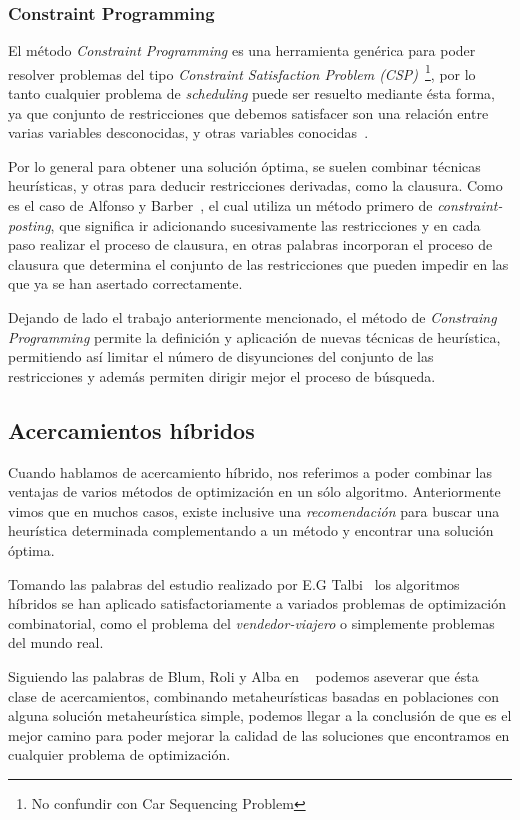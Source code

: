\subsubsection{Constraint Programming}

El método \emph{Constraint Programming} es una herramienta genérica para poder resolver problemas
del tipo \emph{Constraint  Satisfaction Problem (CSP)}~\footnote{No confundir con Car Sequencing Problem},
por lo tanto cualquier problema de \emph{scheduling} puede ser resuelto mediante ésta forma,
ya que conjunto de restricciones que debemos satisfacer son una relación entre varias variables desconocidas,
y otras variables conocidas~\cite{Tsa93}.

%
Por lo general para obtener una solución óptima, se suelen combinar técnicas heurísticas,
y otras para deducir restricciones derivadas, como la clausura.
Como es el caso de Alfonso y Barber~\cite{esp1}, el cual utiliza un método primero de \emph{constraint-posting},
que significa ir adicionando sucesivamente las restricciones y en cada paso realizar el proceso de clausura,
en otras palabras incorporan el proceso de clausura que determina el conjunto de las restricciones que pueden
impedir  en las que ya se han asertado correctamente.

Dejando de lado el trabajo anteriormente mencionado, el método de \emph{Constraing Programming} permite la definición
y aplicación de nuevas técnicas de heurística, permitiendo así limitar el número de disyunciones
del conjunto de las restricciones y además permiten dirigir mejor el proceso de búsqueda.

\subsection{Acercamientos híbridos}

Cuando hablamos de acercamiento híbrido, nos referimos a poder combinar las ventajas de varios
métodos de optimización en un sólo algoritmo.
Anteriormente vimos que en muchos casos, existe inclusive una \emph{recomendación} para buscar
una heurística determinada complementando a un método y encontrar una solución óptima.


Tomando las palabras del estudio realizado por E.G Talbi~\cite{talbi} los algoritmos híbridos
se han aplicado satisfactoriamente a variados problemas de optimización combinatorial, como el problema
del \emph{vendedor-viajero} o simplemente problemas del mundo real.


Siguiendo las palabras de Blum, Roli y Alba en ~\cite{blum} podemos aseverar que ésta clase de acercamientos,
combinando metaheurísticas basadas en  poblaciones con alguna solución metaheurística simple, podemos llegar
a la conclusión de que es el mejor camino para poder mejorar la calidad de las soluciones que encontramos
en cualquier problema de optimización.

